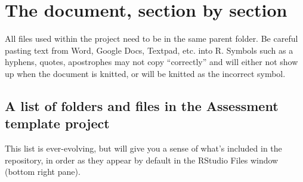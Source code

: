\documentclass[12pt,]{article}
\begin{document}
\section{The document, section by
section}\label{the-document-section-by-section}

All files used within the project need to be in the same parent folder.
Be careful pasting text from Word, Google Docs, Textpad, etc. into R.
Symbols such as a hyphens, quotes, apostrophes may not copy
``correctly'' and will either not show up when the document is knitted,
or will be knitted as the incorrect symbol.

\subsection{A list of folders and files in the Assessment template
project}\label{a-list-of-folders-and-files-in-the-assessment-template-project}

This list is ever-evolving, but will give you a sense of what's included
in the repository, in order as they appear by default in the RStudio
Files window (bottom right pane).
\end{document}
